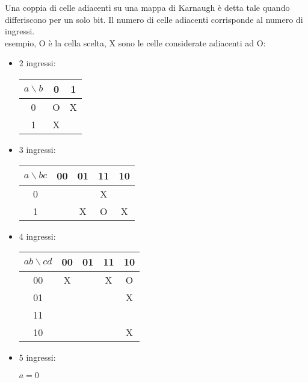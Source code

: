 \documentclass{article}
\begin{document}
Una coppia di celle adiacenti su una mappa di Karnaugh è detta tale quando differiscono per un solo bit.
Il numero di celle adiacenti corrisponde al numero di ingressi.\\

\noindent
esempio, O è la cella scelta, X sono le celle considerate adiacenti ad O:

\begin{itemize}
    \item 2 ingressi:

    \begin{center}
    \begin{tabular}{ |c|c|c| }
    \hline
    $a \backslash b$ & 0 & 1 \\
    \hline
    \hline
    0 & O & X \\
    1 & X & \\
    \hline
    \end{tabular}
    \end{center}

    \item 3 ingressi:

    \begin{center}
    \begin{tabular}{ |c|c|c|c|c| }
    \hline
    $a \backslash bc$ & 00 & 01 & 11 & 10 \\
    \hline
    \hline
    0 & & & X & \\
    1 & & X & O & X \\
    \hline
    \end{tabular}
    \end{center}

    \item 4 ingressi:

    \begin{center}
    \begin{tabular}{ |c|c|c|c|c| }
    \hline
    $ab \backslash cd$ & 00 & 01 & 11 & 10 \\
    \hline
    \hline
    00 & X & & X & O \\
    01 & & & & X \\
    11 & & & & \\
    10 & & & & X \\
    \hline
    \end{tabular}
    \end{center}

    \item 5 ingressi:

    $a=0$


\end{itemize}
\end{document}
